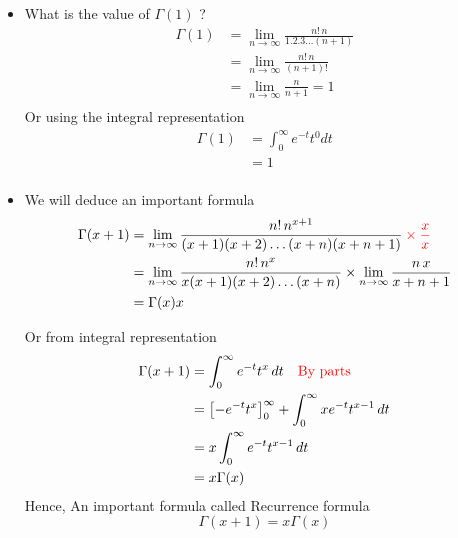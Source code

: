 \documentclass[oneside]{book}
\begin{document}
\begin{itemize}
    \item What is the value of $\Gamma{(1)}$ ?
          \begin{align*}
              \Gamma{(1)} & = \lim_{n \to \infty} \frac{n! \, n}{1.2.3\dots(n+1)} \\
                          & = \lim_{n \to \infty} \frac{n! \, n}{(n+1)!}          \\
                          & = \lim_{n \to \infty} \frac{n}{n+1} = 1               \\
          \end{align*}
          Or using the integral representation
          \begin{align*}
              \Gamma{(1)} & = \int_0^\infty e^{-t} t^0 dt \\
                          & = 1                           \\
          \end{align*}
    \item We will deduce an important formula
          \begin{align*}
              \Gamma{(x+1)} & = \lim_{n \to \infty} \frac{n! \, n^{x+1}}{(x+1)(x+2)\dots (x+n)(x+n+1)} \color{red} \times \frac{x}{x}         \\
                            & = \lim_{n \to \infty} \frac{n! \, n^x}{ x(x+1)(x+2)\dots (x+n)} \times \lim_{n \to \infty} \frac{n \, x}{x+n+1} \\
                            & = \Gamma{(x)} x
          \end{align*}

Or from integral representation
          \begin{align*}
              \Gamma{(x+1)} & =\int_0^\infty e^{-t} t^x \, dt \quad \color{red}\text{By parts}            \\
                            & = \left[-e^{-t} t^x \right]_0^\infty + \int_0^\infty xe^{-t} t^{x-1}  \, dt \\
                            & = x \int_0^\infty e^{-t} t^{x-1}  \, dt                                     \\
                            & = x \Gamma{(x)}
          \end{align*}
          Hence, An important formula called Recurrence formula
          \begin{equation}
              \label{Recurrenceformula}
              \boxed{\Gamma{(x+1)} = x \Gamma{(x)}}
          \end{equation}
    \end{itemize}
\end{document}
